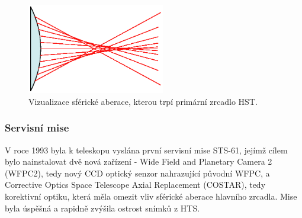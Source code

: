 \documentclass[a4paper,11pt]{article}
\begin{document}
\begin{figure}[h]
        \begin{center}
                \includegraphics[width=6cm]{Spherical_aberration_2.eps}
                \caption{Vizualizace sférické aberace, kterou trpí primární zrcadlo HST.}
                \label{Spherical_aberration_2}
        \end{center}
\end{figure}


\subsubsection{Servisní mise}
V roce 1993 byla k teleskopu vyslána první servisní mise STS-61, jejímž cílem bylo nainstalovat dvě nová zařízení - Wide Field and Planetary Camera 2 (WFPC2), tedy nový CCD optický senzor nahrazující původní WFPC, a Corrective Optics Space Telescope Axial Replacement (COSTAR), tedy korektivní optiku, která měla omezit vliv sférické aberace hlavního zrcadla. Mise byla úspěšná a rapidně zvýšila ostrost snímků z HTS.
\end{document}
